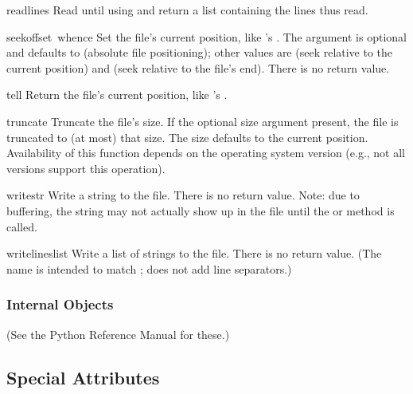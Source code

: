 \begin{funcdesc}{readlines}{}
  Read until \EOF{} using  and return a list containing
  the lines thus read.
\end{funcdesc}

\begin{funcdesc}{seek}{offset\, whence}
  Set the file's current position, like 's .
  The  argument is optional and defaults to 
  (absolute file positioning); other values are  (seek
  relative to the current position) and  (seek relative to the
  file's end).  There is no return value.
\end{funcdesc}

\begin{funcdesc}{tell}{}
  Return the file's current position, like 's .
\end{funcdesc}

\begin{funcdesc}{truncate}{}
Truncate the file's size.  If the optional size argument present, the
file is truncated to (at most) that size.  The size defaults to the
current position.  Availability of this function depends on the
operating system version (e.g., not all \UNIX{} versions support this
operation).
\end{funcdesc}

\begin{funcdesc}{write}{str}
Write a string to the file.  There is no return value.  Note: due to
buffering, the string may not actually show up in the file until
the  or  method is called.
\end{funcdesc}

\begin{funcdesc}{writelines}{list}
Write a list of strings to the file.  There is no return value.
(The name is intended to match ; 
does not add line separators.)
\end{funcdesc}

\subsubsection{Internal Objects}

(See the Python Reference Manual for these.)

\subsection{Special Attributes}

